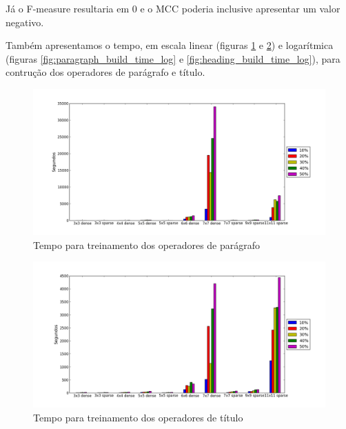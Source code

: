 \documentclass[a4paper,11pt]{article}
\begin{document}
  Já o F-measure resultaria em 0 e o MCC poderia inclusive apresentar um valor negativo.

  Também apresentamos o tempo, em escala linear (figuras \ref{fig:paragraph_build_time} e \ref{fig:heading_build_time}) e logarítmica (figuras \ref{fig:paragraph_build_time_log} e \ref{fig:heading_build_time_log}), para contrução dos operadores de parágrafo e título.

  \begin{figure}[p]
    \centerline{\includegraphics[width=1.2\textwidth]{assets/experiment_charts/TextRegion_paragraph_time.png}}
    \caption{Tempo para treinamento dos operadores de parágrafo}
    \label{fig:paragraph_build_time}
  \end{figure}

  \begin{figure}[p]
    \centerline{\includegraphics[width=1.2\textwidth]{assets/experiment_charts/TextRegion_heading_time.png}}
    \caption{Tempo para treinamento dos operadores de título}
    \label{fig:heading_build_time}
  \end{figure}
\end{document}
